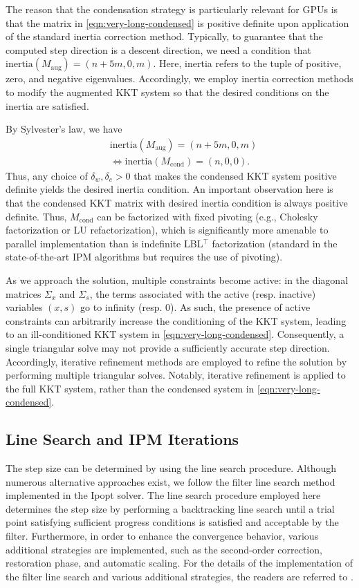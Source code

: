 \documentclass{IEEEtran4PSCC} %
\begin{document}
The reason that the condensation strategy is particularly relevant for
GPUs is that the matrix in \eqref{eqn:very-long-condensed} is positive
definite upon application of the standard inertia correction
method. Typically, to guarantee that the computed step direction is a
descent direction, we need a condition that
$\text{inertia}(M_\text{aug}) = (n+5m,0,m)$. Here, inertia refers to
the tuple of positive, zero, and negative eigenvalues. Accordingly, we
employ inertia correction methods to modify the augmented KKT system
so that the desired conditions on the inertia are satisfied.

By Sylvester's law, we have
\begin{align*}
  &\text{inertia}(M_\text{aug}) = (n+5m,0,m)\\
  &\iff \text{inertia}(M_\text{cond}) = (n,0,0).
\end{align*}
Thus, any choice of $\delta_w,\delta_c>0$ that makes the condensed KKT
system positive definite yields the desired inertia condition.
An important observation here is that the condensed KKT matrix
with desired inertia condition is always positive definite.
Thus, $M_{\text{cond}}$ can be factorized with fixed pivoting (e.g.,
Cholesky factorization or LU refactorization), which is significantly
more amenable to parallel implementation than is indefinite LBL$^\top$
factorization (standard in the state-of-the-art IPM
algorithms but requires the use of pivoting).

As we approach the solution, multiple constraints become active:
in the diagonal matrices $\Sigma_x$ and $\Sigma_s$, the terms associated
with the active (resp. inactive) variables $(x, s)$ go to infinity
(resp. $0$).
As such, the presence of active constraints can arbitrarily
increase the conditioning of the KKT system, leading to
an ill-conditioned KKT system in \eqref{eqn:very-long-condensed}.
Consequently, a single triangular solve may not provide a
sufficiently accurate step direction. Accordingly, iterative
refinement methods are employed to refine the solution by performing
multiple triangular solves. Notably, iterative refinement is applied
to the full KKT system, rather than the condensed system in
\eqref{eqn:very-long-condensed}.

\subsection{Line Search and IPM Iterations}

The step size can be determined by using the line search procedure.
Although numerous alternative approaches exist, we follow the
filter line search method implemented in the Ipopt solver. The line
search procedure employed here determines the step size by performing
a backtracking line search until a trial point satisfying sufficient
progress conditions is satisfied and acceptable by the
filter. Furthermore, in order to enhance the convergence behavior, various
additional strategies are implemented, such as the second-order
correction, restoration phase, and automatic scaling. For the details
of the implementation of the filter line search and various additional
strategies, the readers are referred to
\cite{wachter2006implementation}.
\end{document}
